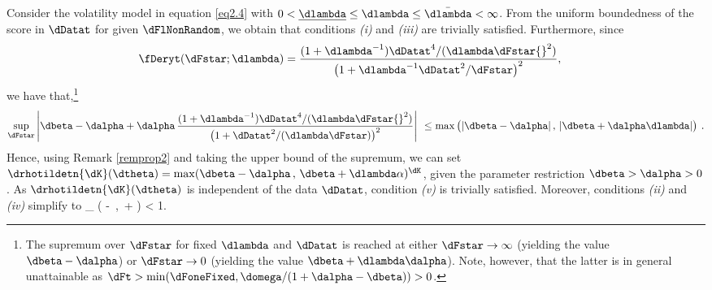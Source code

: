 \begin{exmc} %
Consider the volatility model in equation \eqref{eq2.4} with $0 < \underline\dlambda \leq \dlambda \leq \bar\dlambda < \infty$.
From the uniform boundedness of the score in $\dDatat$ for given $\dFlNonRandom$, we obtain that conditions \textit{(i)} and \textit{(iii)} are trivially satisfied. Furthermore,  since
\begin{align} \label{extra1a}
    \fDeryt(\dFstar;\dlambda) &= 
    \frac{
        (1 + \dlambda^{-1}) \dDatat^4/(\dlambda\dFstar{}^2)
    }{
        \left(1 + \dlambda^{-1}\dDatat^2/\dFstar \right)^2
    },
\end{align}
we have that,\footnote{The supremum over $\dFstar$ for fixed $\dlambda$ and $\dDatat$ is reached at either $\dFstar \to \infty $ (yielding the value $\dbeta-\dalpha$) or $\dFstar \to 0$ (yielding the value $\dbeta+\dlambda\dalpha$). Note, however, that the latter is in general unattainable as $\dFt > \min(\dFoneFixed, \domega/(1+\dalpha-\dbeta)) > 0$.} 
\begin{align} \label{extra1b}
	\sup_{\dFstar}
	\left|
		\dbeta - \dalpha 
		+ \dalpha\,
		\frac{(1+\dlambda^{-1})\dDatat^4/(\dlambda\dFstar{}^2)}
		{\big(1+\dDatat^2/(\dlambda\dFstar)\big)^2}
	\right|^{\ }
	\leq
	\max\big(
		|\dbeta-\dalpha|\,,\,
		|\dbeta+\dalpha\dlambda|
	\big)^{\ }.
\end{align}
Hence, using Remark \ref{remprop2} and taking the upper bound of the supremum, we can set
    $\drhotildetn{\dK}(\dtheta) =\max(\dbeta-\dalpha\,,\,\dbeta + \dlambda\alpha)^{\dK}$,
given the parameter restriction $\dbeta>\dalpha>0$.
As $\drhotildetn{\dK}(\dtheta)$ is independent of the data $\dDatat$, condition \textit{(v)} is trivially satisfied.
Moreover, conditions \textit{(ii)} and \textit{(iv)} simplify to
    \sup_{\dtheta\in\fTheta}
    \max \Big( \dbeta - \dalpha \,,\, \dbeta + \dlambda\alpha \Big) < 1.
\eq


\end{exmc}

